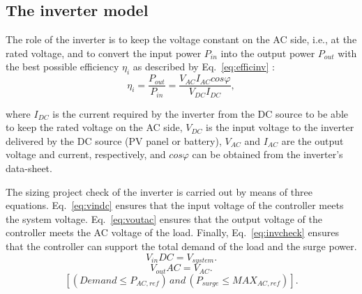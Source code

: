 \documentclass[journal]{IEEEtran}
\begin{document}
\subsection{The inverter model}
The role of the inverter is to keep the voltage constant on the AC side, i.e., at the rated voltage, %
and to convert the input power $ P_{in} $ into the output power $ P_{out} $ with the best possible efficiency $ \eta_{i} $ as described by Eq.~\eqref{eq:efficinv} \cite{Hansen}:
%
\begin{equation}
\label{eq:efficinv}
\eta_{i} = \dfrac{P_{out}}{P_{in}} = \dfrac{V_{AC} I_{AC} cos\varphi}{V_{DC}I_{DC}},
\end{equation}

\noindent where $ I_{DC} $ is the current required by the inverter from the DC source to be able to keep the rated voltage on the AC side, $ V_{DC} $ is the input voltage to the inverter delivered by the DC source (PV panel or battery),  $ V_{AC}  $ and $ I_{AC} $ are the output voltage and current, respectively, and $ cos \varphi $ can be obtained from the inverter's data-sheet.

%
The sizing project check of the inverter is carried out by means of three equations. Eq.~\eqref{eq:vindc} ensures that the input voltage of the controller meets the system voltage. Eq.~\eqref{eq:voutac} ensures that the output voltage of the controller meets the AC voltage of the load. Finally, Eq.~\eqref{eq:invcheck} ensures that the controller can support the total demand of the load and the surge power.
%
\begin{equation}
\label{eq:vindc} 
V_{in}DC = V_{system}.
\end{equation}
%
\begin{equation}
\label{eq:voutac} 
V_{out}AC = V_{AC}.
\end{equation}
%
\begin{equation}
\label{eq:invcheck} 
\left[ (Demand \leq P_{AC,ref}) \, and \, (P_{surge} \leq MAX_{AC,ref}) \right].
\end{equation}
\end{document}
